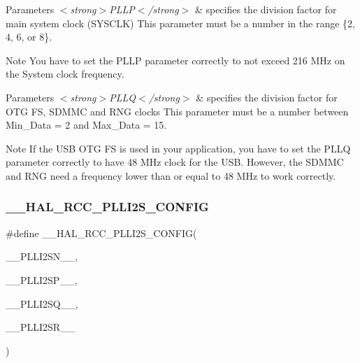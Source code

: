\begin{DoxyParams}{Parameters}
{\em $<$strong$>$\+P\+L\+L\+P$<$/strong$>$} & specifies the division factor for main system clock (S\+Y\+S\+C\+LK) This parameter must be a number in the range \{2, 4, 6, or 8\}. \\
\hline
\end{DoxyParams}
\begin{DoxyNote}{Note}
You have to set the P\+L\+LP parameter correctly to not exceed 216 M\+Hz on the System clock frequency. 
\end{DoxyNote}

\begin{DoxyParams}{Parameters}
{\em $<$strong$>$\+P\+L\+L\+Q$<$/strong$>$} & specifies the division factor for O\+TG FS, S\+D\+M\+MC and R\+NG clocks This parameter must be a number between Min\+\_\+\+Data = 2 and Max\+\_\+\+Data = 15. \\
\hline
\end{DoxyParams}
\begin{DoxyNote}{Note}
If the U\+SB O\+TG FS is used in your application, you have to set the P\+L\+LQ parameter correctly to have 48 M\+Hz clock for the U\+SB. However, the S\+D\+M\+MC and R\+NG need a frequency lower than or equal to 48 M\+Hz to work correctly. 
\end{DoxyNote}
\mbox{\label{group___r_c_c_ex___exported___macros_ga9aafdab89de4a330a682731e28e535eb}} 
\subsubsection{\texorpdfstring{\_\_HAL\_RCC\_PLLI2S\_CONFIG}{\_\_HAL\_RCC\_PLLI2S\_CONFIG}}
{\footnotesize\ttfamily \#define \+\_\+\+\_\+\+H\+A\+L\+\_\+\+R\+C\+C\+\_\+\+P\+L\+L\+I2\+S\+\_\+\+C\+O\+N\+F\+IG(\begin{DoxyParamCaption}\item[{}]{\+\_\+\+\_\+\+P\+L\+L\+I2\+S\+N\+\_\+\+\_\+,  }\item[{}]{\+\_\+\+\_\+\+P\+L\+L\+I2\+S\+P\+\_\+\+\_\+,  }\item[{}]{\+\_\+\+\_\+\+P\+L\+L\+I2\+S\+Q\+\_\+\+\_\+,  }\item[{}]{\+\_\+\+\_\+\+P\+L\+L\+I2\+S\+R\+\_\+\+\_\+ }\end{DoxyParamCaption})}


